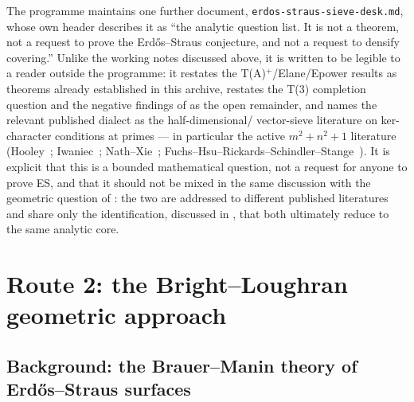 \documentclass[11pt]{article}
\theoremstyle{plain}
\theoremstyle{definition}
\theoremstyle{remark}
\renewcommand{\_}{\textunderscore\allowbreak}
\begin{document}
The programme maintains one further document, \texttt{erdos-\allowbreak straus-\allowbreak sieve-\allowbreak desk.md}, whose own
header describes it as ``the analytic question list. It is not a theorem, not a request to prove
the Erd\H{o}s--Straus conjecture, and not a request to densify covering.'' Unlike the working
notes discussed above, it is written to be legible to a reader outside the programme: it restates
the T(A)$^+$/E\_lane/E\_power results as theorems already established in this archive, restates
the T(3) completion question and the negative findings of 
as the open remainder, and names the relevant published dialect as the half-dimensional/
vector-sieve literature on ker-character conditions at primes — in particular the active
$m^2+n^2+1$ literature (Hooley~\cite{Hooley1973}; Iwaniec~\cite{Iwaniec1974,Iwaniec1976};
Nath--Xie~\cite{NathXie2025}; Fuchs--Hsu--Rickards--Schindler--Stange~\cite{FHRSS2025}). It is
explicit that this is a bounded mathematical question, not a request for anyone to prove ES, and
that it should not be mixed in the same discussion with the geometric question of
: the two are addressed to different published literatures and
share only the identification, discussed in , that both ultimately reduce
to the same analytic core.


\section{Route 2: the Bright--Loughran geometric approach}
\label{sec:route2}

\subsection{Background: the Brauer--Manin theory of Erd\H{o}s--Straus surfaces}
\label{subsec:blbackground}
\end{document}
